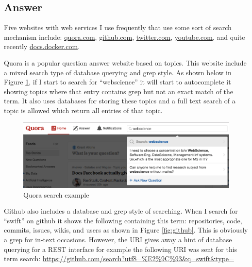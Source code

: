 \documentclass[letterpaper,11pt]{article}
\begin{document}
\subsection*{Answer}

Five websites with web services I use frequently that use some sort of search mechanism include: \url{quora.com}, \url{github.com}, \url{twitter.com}, \url{youtube.com}, and quite recently \url{docs.docker.com}.

Quora is a popular question answer website based on topics. This website include a mixed search type of database querying and grep style. As shown below in Figure \ref{fig:quora}, if I start to search for ``webscience'' it will start to autocomplete it showing topics where that entry contains grep but not an exact match of the term. It also uses databases for storing these topics and a full text search of a topic is allowed which return all entries of that topic.

\begin{figure}[h]
\centering
\includegraphics[scale=0.35]{quora.png}
\caption{Quora search example}
\label{fig:quora}
\end{figure}

Github also includes a database and grep style of searching. When I search for ``swift'' on github it shows the following containing this term: repositories, code, commits, issues, wikis, and users as shown in Figure \ref{fig:github}. This is obviously a grep for in-text occasions. However, the URI gives away a hint of database querying for a REST interface for example the following URI was sent for this term search: \url{https://github.com/search?utf8=%E2%9C%93&q=swift&type=}
\end{document}
